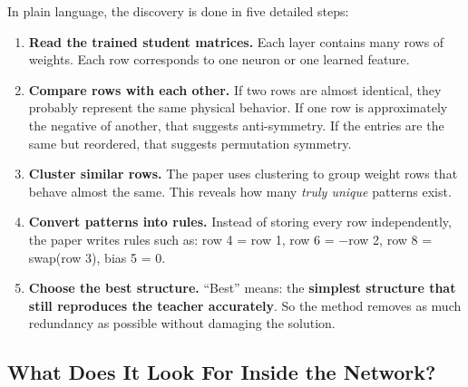 \documentclass[11pt,a4paper]{article}
\begin{document}
In plain language, the discovery is done in five detailed steps:

\begin{enumerate}[leftmargin=*]
    \item \textbf{Read the trained student matrices.} Each layer contains many rows of weights. Each row corresponds to one neuron or one learned feature.
    \item \textbf{Compare rows with each other.} If two rows are almost identical, they probably represent the same physical behavior. If one row is approximately the negative of another, that suggests anti-symmetry. If the entries are the same but reordered, that suggests permutation symmetry.
    \item \textbf{Cluster similar rows.} The paper uses clustering to group weight rows that behave almost the same. This reveals how many \textit{truly unique} patterns exist.
    \item \textbf{Convert patterns into rules.} Instead of storing every row independently, the paper writes rules such as: row 4 = row 1, row 6 = $-$row 2, row 8 = swap(row 3), bias 5 = 0.
    \item \textbf{Choose the best structure.} ``Best'' means: the \textbf{simplest structure that still reproduces the teacher accurately}. So the method removes as much redundancy as possible without damaging the solution.
\end{enumerate}

\subsection*{What Does It Look For Inside the Network?}

\begin{center}
\end{center}
\end{document}
